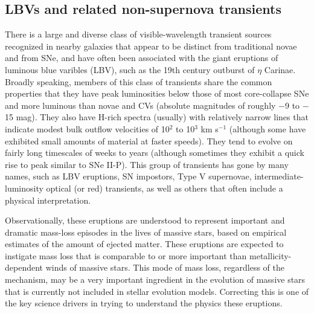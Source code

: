 %
%

\subsection{LBVs and related non-supernova transients}
\def\secname{\chpname:LBVs}\label{sec:\secname}


There is a large and diverse class of visible-wavelength transient
sources recognized in nearby galaxies that appear to be distinct from
traditional novae and from SNe, and have often been associated with
the giant eruptions of luminous blue varibles (LBV), such as the 19th
century outburst of $\eta$ Carinae.  Broadly speaking, members of this
class of transients share the common properties that they have peak
luminosities below those of most core-collapse SNe and more luminous
than novae and CVs (absolute magnitudes of roughly $-$9 to $-$15 mag).
They also have H-rich spectra (usually) with relatively narrow lines
that indicate modest bulk outflow velocities of 10$^2$ to 10$^3$ km
s$^{-1}$ (although some have exhibited small amounts of material at
faster speeds).  They tend to evolve on fairly long timescales of
weeks to years (although sometimes they exhibit a quick rise to peak
similar to SNe II-P). This group of transients has gone by many names,
such as LBV eruptions, SN impostors, Type V supernovae,
intermediate-luminosity optical (or red) transients, as well as others
that often include a physical interpretation.

Observationally, these eruptions are understood to represent important
and dramatic mass-loss episodes in the lives of massive stars, based
on empirical estimates of the amount of ejected matter.
These eruptions are
expected to instigate mass loss that is comparable to or more
important than metallicity-dependent winds of massive stars.  This
mode of mass loss, regardless of the mechanism, may be a very
important ingredient in the evolution of massive stars that is
currently not included in stellar evolution models.  Correcting this
is one of the key science drivers in trying to understand the physics
these eruptions.

